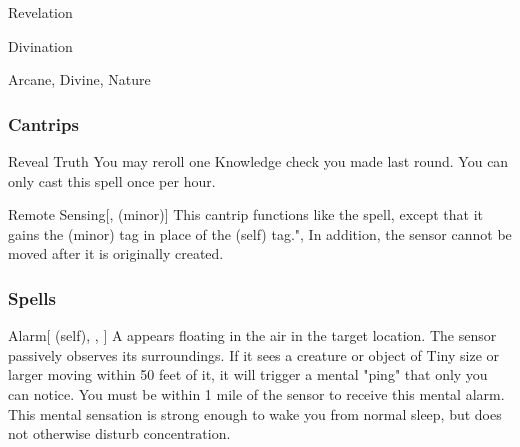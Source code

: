 \newpage
\begin{spellsection}{Revelation}

\begin{spellheader}
\end{spellheader}


 Divination

 Arcane, Divine, Nature

\subsubsection{Cantrips}


\begin{freeability}{Reveal Truth}
You may reroll one Knowledge check you made last round.
You can only cast this spell once per hour.
\end{freeability}


\begin{freeability}{Remote Sensing}[,  (minor)]
This cantrip functions like the  spell, except that it gains the  (minor) tag in place of the  (self) tag.",
In addition, the sensor cannot be moved after it is originally created.
\end{freeability}

\end{spellsection}


\subsubsection{Spells}


\lowercase{\hypertarget{spell:Alarm}{}}\label{spell:Alarm}
\begin{attuneability}[\nth{1}]{\hypertarget{spell:Alarm}{Alarm}}[ (self), , ]
A  appears floating in the air in the target location.
The sensor passively observes its surroundings.
If it sees a creature or object of Tiny size or larger moving within 50 feet of it, it will trigger a mental "ping" that only you can notice.
You must be within 1 mile of the sensor to receive this mental alarm.
This mental sensation is strong enough to wake you from normal sleep, but does not otherwise disturb concentration.
\end{attuneability}
\vspace{0.25em}



